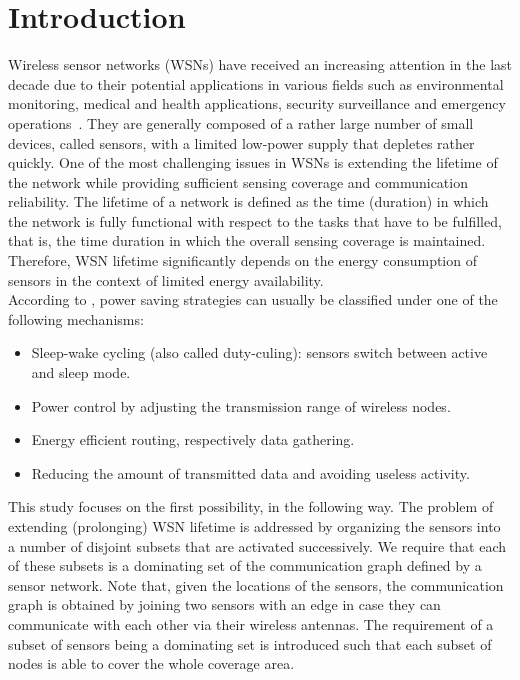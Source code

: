 \documentclass[algorithms,article,accept,moreauthors,pdftex]{Definitions/mdpi}
\begin{document}
\section{Introduction}

Wireless sensor networks (WSNs) have received an increasing attention in the last decade due to their potential applications in various fields such as environmental monitoring, medical and health applications,
security surveillance and emergency operations~\cite{yet2017:WSNsurvey}. They are generally composed of a rather large number of small devices, called sensors, with a limited low-power supply that depletes rather quickly.
One of the most challenging issues in WSNs is extending the lifetime of the network while providing sufficient sensing coverage and communication reliability.  The lifetime of a network is defined as the time (duration) in which the network is fully functional with respect to the tasks that have to be fulfilled, that is, the time duration in which the overall sensing coverage is maintained. Therefore, WSN lifetime significantly depends on the energy consumption of sensors in the context of limited energy availability.\\

According to \cite{cardei2005energy}, power saving strategies can usually be classified under one of the following mechanisms:
\begin{itemize}
\item Sleep-wake cycling (also called duty-culing): sensors switch between active and sleep mode.
\item Power control by adjusting the transmission range of wireless nodes.
\item Energy efficient routing, respectively data gathering.
\item Reducing the amount of transmitted data and avoiding useless activity.
\end{itemize}
This study focuses on the first possibility, in the following way. The problem of extending (prolonging) WSN lifetime is addressed by organizing the sensors into a number of disjoint subsets that are activated successively. We require that each of these subsets is a dominating set of the communication graph defined by a sensor network. Note that, given the locations of the sensors, the communication graph is obtained by joining two sensors with an edge in case they can communicate with each other via their wireless antennas. The requirement of a subset of sensors being a dominating set is introduced such that each subset of nodes is able to cover the whole coverage area. \\
\end{document}
